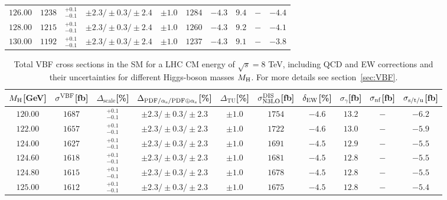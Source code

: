 \begin{table}[ht!]
\begin{center}
\begin{small}
\begin{tabular}{cccccccc|cc}
$126.00$ & $1238$ & $^{+0.1}_{-0.1}$ & $\pm 2.3/\pm 0.3/\pm 2.4$ & $\pm 1.0$ & $1284$ & $-4.3$ & $9.4$ & $-$ & $-4.4$ \\
$128.00$ & $1215$ & $^{+0.1}_{-0.1}$ & $\pm 2.3/\pm 0.3/\pm 2.4$ & $\pm 1.0$ & $1260$ & $-4.3$ & $9.2$ & $-$ & $-4.1$ \\
$130.00$ & $1192$ & $^{+0.1}_{-0.1}$ & $\pm 2.3/\pm 0.3/\pm 2.4$ & $\pm 1.0$ & $1237$ & $-4.3$ & $9.1$ & $-$ & $-3.8$ \\
\bottomrule
\end{tabular}%
\end{small}%
\end{center}%
\end{table}

\begin{table}[ht!]
\caption{Total VBF cross sections in the SM for a LHC CM energy of $\sqrt{s}=8$ TeV, including QCD and EW corrections
and their uncertainties for different Higgs-boson masses $M_\mathrm{H}$. For more details see section~\ref{sec:VBF}.}
\label{tab:vbf_XStot_8}
\begin{center}%
\begin{small}%
\begin{tabular}{cccccccc|cc}%
\toprule
$M_\mathrm{H}$[GeV] & $\sigma^{\mathrm{VBF}}$[fb] & $\Delta_{\mathrm{scale}}$[\%] & $\Delta_{\mathrm{PDF}/\alpha_{\mathrm{s}}/\mathrm{PDF\oplus\alpha_{\mathrm{s}}}}$[\%] & $\Delta_{\mathrm{TU}}$[\%] &
$\sigma_{\mathrm{N3LO}}^{\mathrm{DIS}}$[fb] & $\delta_{\mathrm{EW}}$[\%] & $\sigma_{\gamma}$[fb] & $\sigma_{\mbox{\scriptsize nf}}$[fb] & $\sigma_{\mbox{\scriptsize s/t/u}}$[fb]
\\
\midrule
$120.00$ & $1687$ & $^{+0.1}_{-0.1}$ & $\pm 2.3/\pm 0.3/\pm 2.3$ & $\pm 1.0$ & $1754$ & $-4.6$ & $13.2$ & $-$ & $-6.2$ \\
$122.00$ & $1657$ & $^{+0.1}_{-0.1}$ & $\pm 2.3/\pm 0.3/\pm 2.3$ & $\pm 1.0$ & $1722$ & $-4.6$ & $13.0$ & $-$ & $-5.9$ \\
$124.00$ & $1627$ & $^{+0.1}_{-0.1}$ & $\pm 2.3/\pm 0.3/\pm 2.3$ & $\pm 1.0$ & $1691$ & $-4.5$ & $12.9$ & $-$ & $-5.5$ \\
$124.60$ & $1618$ & $^{+0.1}_{-0.1}$ & $\pm 2.3/\pm 0.3/\pm 2.3$ & $\pm 1.0$ & $1681$ & $-4.5$ & $12.8$ & $-$ & $-5.5$ \\
$124.80$ & $1615$ & $^{+0.1}_{-0.1}$ & $\pm 2.3/\pm 0.3/\pm 2.3$ & $\pm 1.0$ & $1678$ & $-4.5$ & $12.8$ & $-$ & $-5.5$ \\
$125.00$ & $1612$ & $^{+0.1}_{-0.1}$ & $\pm 2.3/\pm 0.3/\pm 2.3$ & $\pm 1.0$ & $1675$ & $-4.5$ & $12.8$ & $-$ & $-5.4$ \\

\end{tabular}
\end{small}
\end{center}
\end{table}
